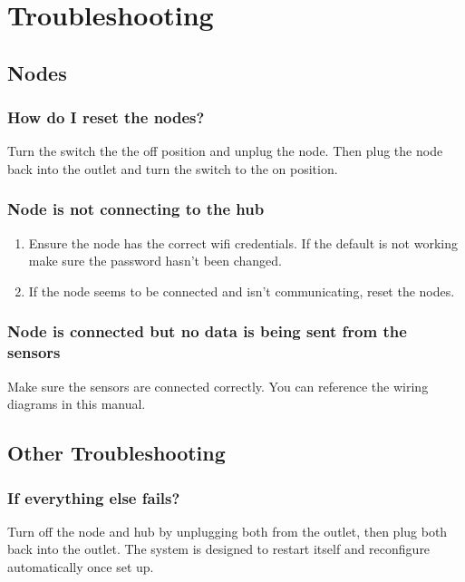   \section{Troubleshooting}
  \subsection{Nodes}
  \subsubsection{How do I reset the nodes?}
    \item Turn the switch the the off position and unplug the node. Then plug the node back into the outlet
  and turn the switch to the on position.
  \subsubsection{Node is not connecting to the hub}
  \begin{enumerate}
    \item Ensure the node has the correct wifi credentials. If the default is not
    working make sure the password hasn't been changed.
    \item If the node seems to be connected and isn't communicating, reset the nodes.
  \end{enumerate}
  \subsubsection{Node is connected but no data is being sent from the sensors}
    \item   Make sure the sensors are connected correctly. You can reference the wiring diagrams
     in this manual.

  \subsection{Other Troubleshooting}
  \subsubsection{If everything else fails?}
    \item Turn off the node and hub by unplugging both from the outlet, then plug both back into the outlet. The system
     is designed to restart itself and reconfigure automatically once set up.
